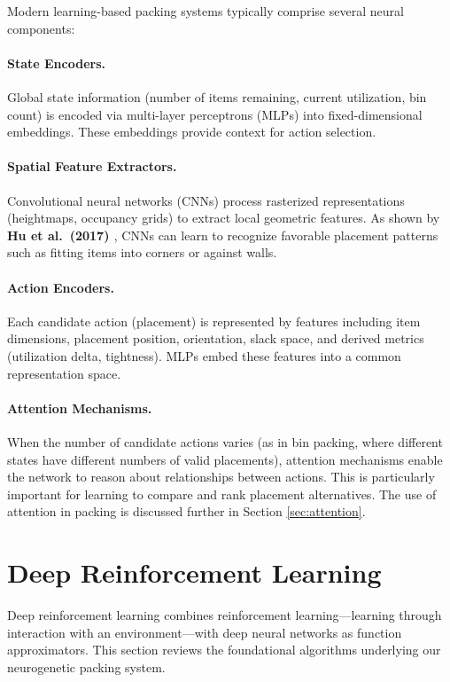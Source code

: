 Modern learning-based packing systems typically comprise several neural components:

\paragraph{State Encoders.}
Global state information (number of items remaining, current utilization, bin count) is encoded via multi-layer perceptrons (MLPs) into fixed-dimensional embeddings. These embeddings provide context for action selection.

\paragraph{Spatial Feature Extractors.}
Convolutional neural networks (CNNs) process rasterized representations (heightmaps, occupancy grids) to extract local geometric features. As shown by \textbf{Hu et al.\ (2017) \cite{HLZ17}}, CNNs can learn to recognize favorable placement patterns such as fitting items into corners or against walls.

\paragraph{Action Encoders.}
Each candidate action (placement) is represented by features including item dimensions, placement position, orientation, slack space, and derived metrics (utilization delta, tightness). MLPs embed these features into a common representation space.

\paragraph{Attention Mechanisms.}
When the number of candidate actions varies (as in bin packing, where different states have different numbers of valid placements), attention mechanisms enable the network to reason about relationships between actions. This is particularly important for learning to compare and rank placement alternatives. The use of attention in packing is discussed further in Section \ref{sec:attention}.

\section{Deep Reinforcement Learning}
\label{sec:deep-rl}

Deep reinforcement learning combines reinforcement learning---learning through interaction with an environment---with deep neural networks as function approximators. This section reviews the foundational algorithms underlying our neurogenetic packing system.

